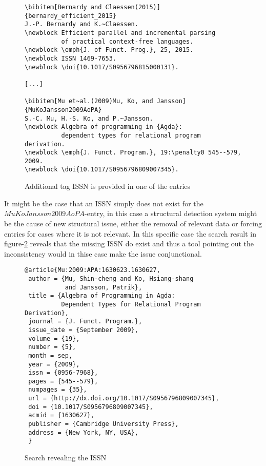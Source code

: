 \begin{figure}[ht]
  \centering
  \begin{small}
\begin{verbatim}
\bibitem[Bernardy and Claessen(2015)]{bernardy_efficient_2015}
J.-P. Bernardy and K.~Claessen.
\newblock Efficient parallel and incremental parsing
          of practical context-free languages.
\newblock \emph{J. of Funct. Prog.}, 25, 2015.
\newblock ISSN 1469-7653.
\newblock \doi{10.1017/S0956796815000131}.

[...]

\bibitem[Mu et~al.(2009)Mu, Ko, and Jansson]{MuKoJansson2009AoPA}
S.-C. Mu, H.-S. Ko, and P.~Jansson.
\newblock Algebra of programming in {Agda}:
          dependent types for relational program derivation.
\newblock \emph{J. Funct. Program.}, 19:\penalty0 545--579, 2009.
\newblock \doi{10.1017/S0956796809007345}.
\end{verbatim}
  \end{small}
  \caption{Additional tag ISSN is provided in one of the entries}
\label{fig:entry_with_issn}
\end{figure}

It might be the case that an ISSN simply does not exist for the
$MuKoJansson2009AoPA$-entry, in this case a structural detection
system might be the cause of new structural issue, either the removal
of relevant data or forcing entries for cases where it is not
relevant.  In this specific case the search result in
figure-\ref{fig:entry_issn_found} reveals that the missing ISSN do
exist and thus a tool pointing out the inconsistency would in thise
case make the issue conjunctional.

\begin{figure}[ht]
  \centering
\begin{verbatim}
@article{Mu:2009:APA:1630623.1630627,
 author = {Mu, Shin-cheng and Ko, Hsiang-shang 
           and Jansson, Patrik},
 title = {Algebra of Programming in Agda: 
          Dependent Types for Relational Program Derivation},
 journal = {J. Funct. Program.},
 issue_date = {September 2009},
 volume = {19},
 number = {5},
 month = sep,
 year = {2009},
 issn = {0956-7968},
 pages = {545--579},
 numpages = {35},
 url = {http://dx.doi.org/10.1017/S0956796809007345},
 doi = {10.1017/S0956796809007345},
 acmid = {1630627},
 publisher = {Cambridge University Press},
 address = {New York, NY, USA},
 }
\end{verbatim}
  \caption{Search revealing the ISSN}
\label{fig:entry_issn_found}
\end{figure}

